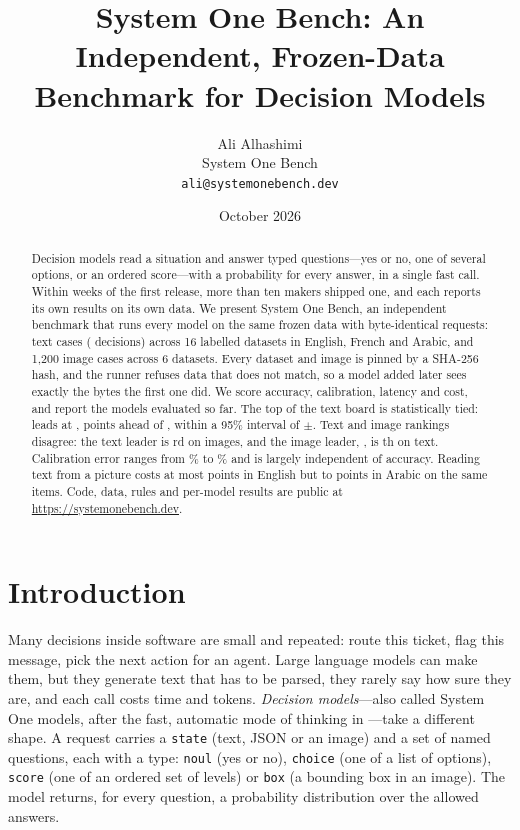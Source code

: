 \documentclass[11pt]{article}
\title{System One Bench: An Independent, Frozen-Data Benchmark for Decision Models}
\author{Ali Alhashimi\\ System One Bench\\ \texttt{ali@systemonebench.dev}}
\date{October 2026}
\begin{document}
\maketitle

\begin{abstract}
Decision models read a situation and answer typed questions---yes or no, one of several options, or an ordered
score---with a probability for every answer, in a single fast call. Within weeks of the first release, more than ten
makers shipped one, and each reports its own results on its own data. We present System One Bench, an independent
benchmark that runs every model on the same frozen data with byte-identical requests: \nCases{} text cases
(\nDecisions{} decisions) across 16 labelled datasets in English, French and Arabic, and 1{,}200 image cases across
6 datasets. Every dataset and image is pinned by a SHA-256 hash, and the runner refuses data that does not match, so
a model added later sees exactly the bytes the first one did. We score accuracy, calibration, latency and cost, and
report the \nModels{} models evaluated so far. The top of the text board is statistically tied: \topText{} leads at
\topTextIdx{}, \topTextGap{} points ahead of \secondText{}, within a 95\% interval of $\pm$\topTextCI{}. Text and image
rankings disagree: the text leader is \topTextVisionRank{}rd on images, and the image leader, \topVision{}, is
\topVisionTextRank{}th on text. Calibration error ranges from \eceMin{}\% to \eceMax{}\% and is largely independent
of accuracy. Reading text from a picture costs at most \enGapWorst{} points in English but \arGapBest{} to
\arGapWorst{} points in Arabic on the same items. Code, data, rules and per-model results are public at
\url{https://systemonebench.dev}.
\end{abstract}

\section{Introduction}

Many decisions inside software are small and repeated: route this ticket, flag this message, pick the next action
for an agent. Large language models can make them, but they generate text that has to be parsed, they rarely say how
sure they are, and each call costs time and tokens. \emph{Decision models}---also called System One models, after
the fast, automatic mode of thinking in \citet{kahneman2011thinking}---take a different shape. A request carries a
\texttt{state} (text, JSON or an image) and a set of named questions, each with a type: \texttt{noul} (yes or no),
\texttt{choice} (one of a list of options), \texttt{score} (one of an ordered set of levels) or \texttt{box} (a
bounding box in an image). The model returns, for every question, a probability distribution over the allowed
answers.
\end{document}
